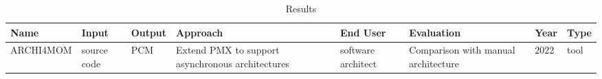 \begin{sidewaystable}
\centering
\begin{tabular}{| p{3cm} | p{2cm} | p{2cm} | p{4cm} | p{2cm} | p{4cm} | l | l |}
\toprule
\textbf{Name} & \textbf{Input} & \textbf{Output} & \textbf{Approach} & \textbf{End User} & \textbf{Evaluation} & \textbf{Year} & \textbf{Type} \\
\midrule
ARCHI4MOM 
& source code
& PCM
& Extend PMX to support asynchronous architectures
& software architect
& Comparison with manual architecture
& 2022
& tool \\
\bottomrule
\end{tabular}
\caption{Results} %
\label{table:results}
\end{sidewaystable}
